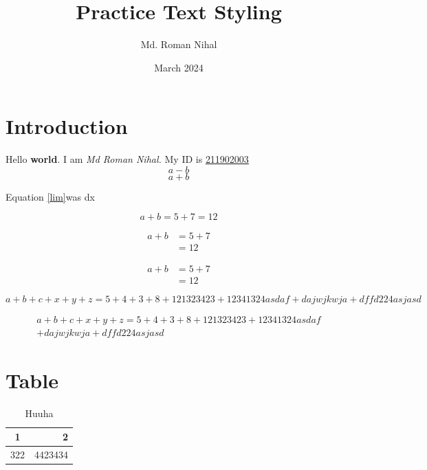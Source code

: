 \documentclass{article}
\title{Practice Text Styling}
\author{Md. Roman Nihal}
\date{March 2024}
\begin{document}
\maketitle

\section{Introduction}
Hello \textbf{world}.
I am \textit{Md Roman Nihal.}
My ID is \underline{211902003}
\begin{equation}\label{lim}
    a-b
\end{equation}
\begin{equation}
    a+b
\end{equation}

Equation \ref{lim}was dx

\begin{equation}
    a+b=5+7 %
    =12
\end{equation}

\begin{align}
    a+b&=5+7\\
    &=12
\end{align}

\begin{equation}
\begin{split}
    a+b&=5+7\\
    &=12 
\end{split}
\end{equation}

\begin{equation}
    a+b+c+x+y+z=5+4+3+8+121323423+12341324asdaf+dajwjkwja+dffd224asjasd
\end{equation}

\begin{multline}
    a+b+c+x+y+z=5+4+3+8+121323423+12341324asdaf\\+dajwjkwja+dffd224asjasd
\end{multline}

\section{Table}

\newpage

\begin{table}
\caption{Huuha}
\label{er}
\begin{center}
\begin{tabular}{|c|r|}
\hline
     1&2 \\\hline
     322&4423434  \\\hline
\end{tabular} 
\end{center}
\end{table}
\end{document}
